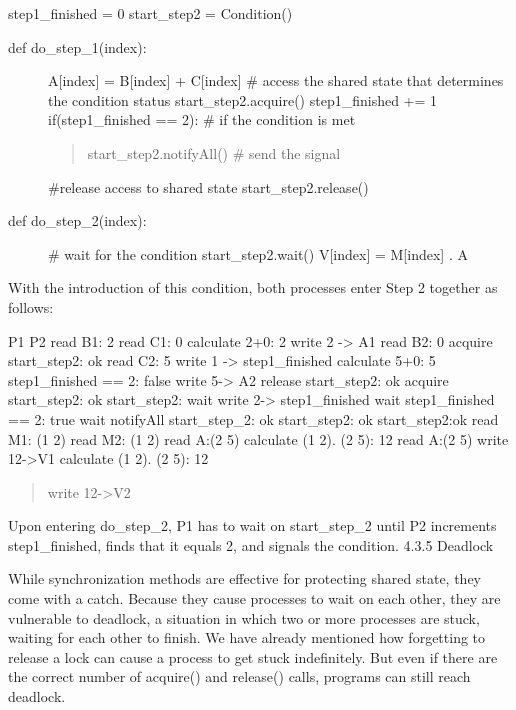 \documentclass[letterpaper,10pt,dvipdfmx]{sphinxmanual}
\begin{document}
step1\_finished = 0
start\_step2 = Condition()
\begin{description}
\item[{def do\_step\_1(index):}] \leavevmode
A{[}index{]} = B{[}index{]} + C{[}index{]}
\# access the shared state that determines the condition status
start\_step2.acquire()
step1\_finished += 1
if(step1\_finished == 2): \# if the condition is met
\begin{quote}

start\_step2.notifyAll() \# send the signal
\end{quote}

\#release access to shared state
start\_step2.release()

\item[{def do\_step\_2(index):}] \leavevmode
\# wait for the condition
start\_step2.wait()
V{[}index{]} = M{[}index{]} . A

\end{description}

With the introduction of this condition, both processes enter Step 2 together as follows:

P1                            P2
read B1: 2
read C1: 0
calculate 2+0: 2
write 2 -\textgreater{} A1                 read B2: 0
acquire start\_step2: ok       read C2: 5
write 1 -\textgreater{} step1\_finished     calculate 5+0: 5
step1\_finished == 2: false    write 5-\textgreater{} A2
release start\_step2: ok       acquire start\_step2: ok
start\_step2: wait             write 2-\textgreater{} step1\_finished
wait                          step1\_finished == 2: true
wait                          notifyAll start\_step\_2: ok
start\_step2: ok               start\_step2:ok
read M1: (1 2)                read M2: (1 2)
read A:(2 5)
calculate (1 2). (2 5): 12    read A:(2 5)
write 12-\textgreater{}V1                  calculate (1 2). (2 5): 12
\begin{quote}

write 12-\textgreater{}V2
\end{quote}

Upon entering do\_step\_2, P1 has to wait on start\_step\_2 until P2 increments step1\_finished, finds that it equals 2, and signals the condition.
4.3.5   Deadlock

While synchronization methods are effective for protecting shared state, they come with a catch. Because they cause processes to wait on each other, they are vulnerable to deadlock, a situation in which two or more processes are stuck, waiting for each other to finish. We have already mentioned how forgetting to release a lock can cause a process to get stuck indefinitely. But even if there are the correct number of acquire() and release() calls, programs can still reach deadlock.
\end{document}
